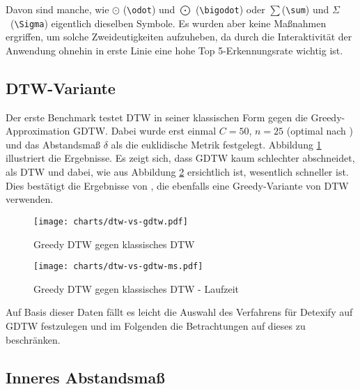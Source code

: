 Davon sind manche, wie $\odot$ (\verb!\odot!) und $\bigodot$ (\verb!\bigodot!) oder $\sum$(\verb!\sum!) und $\Sigma$~(\verb!\Sigma!) eigentlich dieselben Symbole. Es wurden aber keine Maßnahmen ergriffen, um solche Zweideutigkeiten aufzuheben, da durch die Interaktivität der Anwendung ohnehin in erste Linie eine hohe Top 5-Erkennungsrate wichtig ist.

\subsection{DTW-Variante}
\label{sub:gierig_oder_nicht}

Der erste Benchmark testet DTW in seiner klassischen Form gegen die Greedy-Approximation GDTW. Dabei wurde erst einmal $C=50$, $n=25$ (optimal nach \citet{Golubitsky:2009p1842}) und das Abstandsmaß $\delta$ als die euklidische Metrik festgelegt. Abbildung \ref{chart:dtw-vs-gdtw} illustriert die Ergebnisse. Es zeigt sich, dass GDTW kaum schlechter abschneidet, als DTW und dabei, wie aus Abbildung \ref{chart:dtw-vs-gdtw-ms} ersichtlich ist, wesentlich schneller ist. Dies bestätigt die Ergebnisse von \citet{MacLean:2010p9970}, die ebenfalls eine Greedy-Variante von DTW verwenden.

\begin{figure}[htbp]
  \begin{center}
    \texttt{[image: charts/dtw-vs-gdtw.pdf]}
  \end{center}
  \caption{Greedy DTW gegen klassisches DTW}
  \label{chart:dtw-vs-gdtw}
\end{figure}

\begin{figure}[htbp]
  \begin{center}
    \texttt{[image: charts/dtw-vs-gdtw-ms.pdf]}
  \end{center}
  \caption{Greedy DTW gegen klassisches DTW - Laufzeit}
  \label{chart:dtw-vs-gdtw-ms}
\end{figure}

Auf Basis dieser Daten fällt es leicht die Auswahl des Verfahrens für Detexify auf GDTW festzulegen und im Folgenden die Betrachtungen auf dieses zu beschränken.


\subsection{Inneres Abstandsmaß} %
\label{sub:inneres_abstandsmaß}

